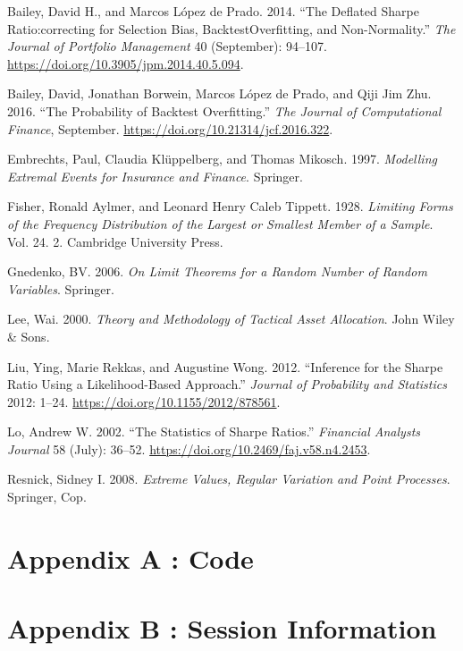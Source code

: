 \documentclass[
  12pt,
]{article}
\newlength{\cslhangindent}
\newenvironment{CSLReferences}[2] %
 {\begin{list}{}{%
  \setlength{\itemindent}{0pt}
  \setlength{\leftmargin}{0pt}
  \setlength{\parsep}{0pt}
  \ifodd #1
   \setlength{\leftmargin}{\cslhangindent}
   \setlength{\itemindent}{-1\cslhangindent}
  \fi
  \setlength{\itemsep}{#2\baselineskip}}}
 {\end{list}}
\begin{document}
\label{refs}
\begin{CSLReferences}{1}{0}
Bailey, David H., and Marcos López de Prado. 2014. {``The Deflated
Sharpe Ratio:correcting for Selection Bias, BacktestOverfitting, and
Non-Normality.''} \emph{The Journal of Portfolio Management} 40
(September): 94--107. \url{https://doi.org/10.3905/jpm.2014.40.5.094}.

Bailey, David, Jonathan Borwein, Marcos López de Prado, and Qiji Jim
Zhu. 2016. {``The Probability of Backtest Overfitting.''} \emph{The
Journal of Computational Finance}, September.
\url{https://doi.org/10.21314/jcf.2016.322}.

Embrechts, Paul, Claudia Klüppelberg, and Thomas Mikosch. 1997.
\emph{Modelling Extremal Events for Insurance and Finance}. Springer.

Fisher, Ronald Aylmer, and Leonard Henry Caleb Tippett. 1928.
\emph{Limiting Forms of the Frequency Distribution of the Largest or
Smallest Member of a Sample}. Vol. 24. 2. Cambridge University Press.

Gnedenko, BV. 2006. \emph{On Limit Theorems for a Random Number of
Random Variables}. Springer.

Lee, Wai. 2000. \emph{Theory and Methodology of Tactical Asset
Allocation}. John Wiley \& Sons.

Liu, Ying, Marie Rekkas, and Augustine Wong. 2012. {``Inference for the
Sharpe Ratio Using a Likelihood-Based Approach.''} \emph{Journal of
Probability and Statistics} 2012: 1--24.
\url{https://doi.org/10.1155/2012/878561}.

Lo, Andrew W. 2002. {``The Statistics of Sharpe Ratios.''}
\emph{Financial Analysts Journal} 58 (July): 36--52.
\url{https://doi.org/10.2469/faj.v58.n4.2453}.

Resnick, Sidney I. 2008. \emph{Extreme Values, Regular Variation and
Point Processes}. Springer, Cop.

\end{CSLReferences}

\newpage

\section{Appendix A : Code}\label{appendix-a-code}

\section{Appendix B : Session
Information}\label{appendix-b-session-information}
\end{document}
